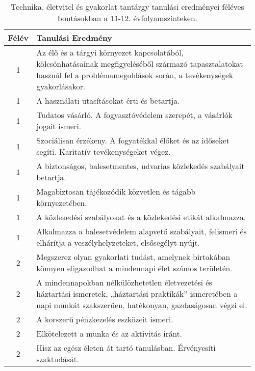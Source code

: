        
           \begin{longtable}{c | p{12cm} }
            \caption[Technika, életvitel és gyakorlat 11-12.]{Technika, életvitel és gyakorlat tantárgy tanulási eredményei féléves bontásokban a 11-12. évfolyamszinteken. }  \\

            \textbf{Félév} & \textbf{Tanulási Eredmény} \\
            \hline
            \endhead
                                
                                          1 &  Az élő és a tárgyi környezet kapcsolatából, kölcsönhatásainak megfigyeléséből származó tapasztalatokat használ fel a problémamegoldások során, a tevékenységek gyakorlásakor. \\ \hline
                                          1 &  A használati utasításokat érti és betartja. \\ \hline
                                          1 &  Tudatos vásárló. A fogyasztóvédelem szerepét, a vásárlók jogait ismeri. \\ \hline
                                          1 &  Szociálisan érzékeny. A fogyatékkal élőket és az időseket segíti. Karitatív tevékenységeket végez. \\ \hline
                                          1 &  A biztonságos, balesetmentes, udvarias közlekedés szabályait betartja. \\ \hline
                                          1 &  Magabiztosan tájékozódik közvetlen és tágabb környezetében. \\ \hline
                                          1 &  A közlekedési szabályokat és a közlekedési etikát alkalmazza. \\ \hline
                                          1 &  Alkalmazza a balesetvédelem alapvető szabályait, felismeri és elhárítja a veszélyhelyzeteket, elsősegélyt nyújt. \\ \hline
                                      
                                
                                          2 &  Megszerez olyan gyakorlati tudást, amelynek birtokában könnyen eligazodhat a mindennapi élet számos területén. \\ \hline
                                          2 &  A mindennapokban nélkülözhetetlen életvezetési és háztartási ismeretek, „háztartási praktikák” ismeretében a napi munkát szakszerűen, hatékonyan, gazdaságosan végzi el. \\ \hline
                                          2 &  A korszerű pénzkezelés eszközeit ismeri. \\ \hline
                                          2 &  Elkötelezett a munka és az aktivitás iránt. \\ \hline
                                          2 &  Hisz az egész életen át tartó tanulásban. Érvényesíti szaktudását. \\ \hline
                                      

\end{longtable}
